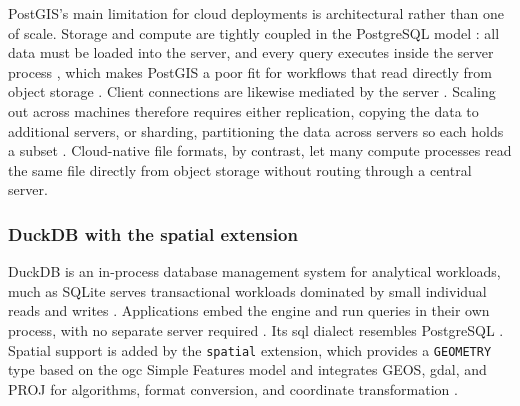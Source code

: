 PostGIS's main limitation for cloud deployments is architectural rather than one of scale. Storage and compute are tightly coupled in the PostgreSQL model \parencite{dageville2016_snowflake_elastic_data_warehouse}: all data must be loaded into the server, and every query executes inside the server process \parencite{postgresql2024_architectural_fundamentals}, which makes PostGIS a poor fit for workflows that read directly from object storage \parencite{pang2024_storage_disaggregated_databases}. Client connections are likewise mediated by the server \parencite{postgresql2024_architectural_fundamentals}. Scaling out across machines therefore requires either replication, copying the data to additional servers, or sharding, partitioning the data across servers so each holds a subset \parencite{stonebraker1986_case_for_shared_nothing}. Cloud-native file formats, by contrast, let many compute processes read the same file directly from object storage without routing through a central server.

\subsubsection{DuckDB with the spatial extension}
\label{background:spatial-data-formats-and-storage-models:full-database-engines:duckdb-with-the-spatial-extension}
DuckDB is an in-process database management system for analytical workloads, much as SQLite serves transactional workloads dominated by small individual reads and writes \parencite{raasveldt2019_duckdb_embeddable_analytical_database}. Applications embed the engine and run queries in their own process, with no separate server required \parencite{raasveldt2019_duckdb_embeddable_analytical_database}. Its \acrshort{sql} dialect resembles PostgreSQL \parencite{duckdb2025_sql_introduction}. Spatial support is added by the \texttt{spatial} extension, which provides a \texttt{GEOMETRY} type based on the \acrshort{ogc} Simple Features model and integrates GEOS, \acrshort{gdal}, and PROJ for algorithms, format conversion, and coordinate transformation \parencite{gabrielsson2023_postgeese_duckdb_spatial_extension, duckdb2025_spatial_extension_overview}.

